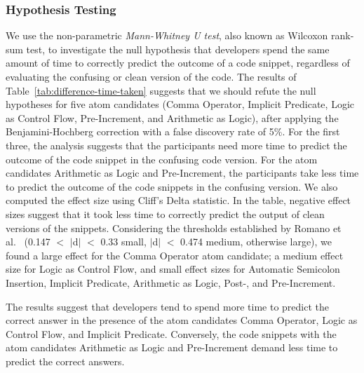 \subsubsection*{Hypothesis Testing}
We use the non-parametric \emph{Mann-Whitney U test}, also known as Wilcoxon rank-sum test, to
investigate the null hypothesis that developers 
spend the same amount of time to correctly
predict the outcome of a code snippet, regardless
of evaluating the confusing or clean version
of the code. The results of Table~\ref{tab:difference-time-taken}
suggests that we should refute the null hypotheses for five atom candidates (Comma Operator, Implicit Predicate, Logic as Control Flow, Pre-Increment, and Arithmetic as Logic), after applying the Benjamini-Hochberg correction with a false discovery rate of 5\%. For the first three, the analysis suggests that the participants need more time to predict the outcome of the code snippet in the confusing code version. For the atom candidates Arithmetic as Logic and Pre-Increment, the participants take less time to predict the outcome of the code snippets in the confusing version. We also computed the effect size using Cliff's Delta statistic. In the table, negative effect sizes suggest that it took less time to correctly predict the output of clean versions of the snippets.  Considering the thresholds established by Romano et al.~\cite{Romano:2006:ASO} (0.147 $<$ $|$d$|$ $<$ 0.33 small, $|$d$|$ $<$ 0.474 medium, otherwise large), we found a large effect for the Comma Operator atom candidate; a medium effect size for Logic as Control Flow, and small effect sizes for Automatic Semicolon Insertion, Implicit Predicate, Arithmetic as Logic, Post-, and Pre-Increment. 


\begin{mh}
  The results suggest that developers tend to spend
  more time to predict the correct answer in the presence of the atom candidates Comma Operator, Logic as Control Flow, and Implicit Predicate. Conversely, the code snippets with the atom candidates Arithmetic as Logic and Pre-Increment demand less time to predict the correct answers. 
\end{mh}




